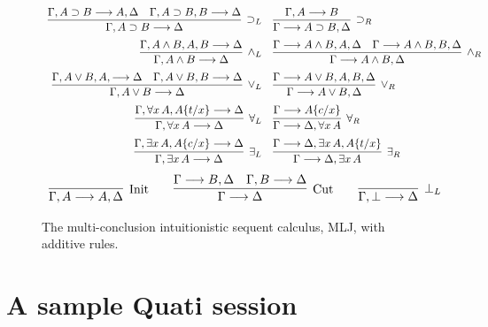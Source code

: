 \documentclass{llncs}
\begin{document}
\begin{figure}
\[
\begin{array} {r@{\quad}l}
\infer[{\supset_L}]{\Gamma, A\supset B \longrightarrow \Delta}{\Gamma,
A\supset B \longrightarrow A, \Delta \quad \Gamma,A\supset B, B \longrightarrow
\Delta }
&
\infer[{\supset_R}]{\Gamma \longrightarrow A \supset B, \Delta}{\Gamma, A
\longrightarrow B}
\\[5pt]
\infer[{\land_L}]{\Gamma, A \land B \longrightarrow \Delta}{\Gamma, A \land
B, A,B \longrightarrow \Delta }
&
\infer[{\land_R}]{\Gamma \longrightarrow A \land B, \Delta}{\Gamma \longrightarrow
A \land B, A, \Delta \quad \Gamma \longrightarrow A \land B,B, \Delta}
\\
[5pt]
\infer[{\lor_L}]{\Gamma, A \lor B \longrightarrow  \Delta}{\Gamma, A \lor B,
A, \longrightarrow \Delta \quad \Gamma, A \lor B,B \longrightarrow  \Delta}
&
\infer[{\lor_R}]{\Gamma \longrightarrow A \lor B, \Delta}{\Gamma \longrightarrow A
\lor B, A,B, \Delta }
\\
[5pt]
\infer[{\forall_L}]{\Gamma, \forall x\,A \longrightarrow \Delta}{\Gamma,
\forall x\,A, A\{t/x\} \longrightarrow \Delta} 
&
\infer[{\forall_R}]{\Gamma \longrightarrow \Delta, \forall x\,A}{\Gamma
\longrightarrow A\{c/x\}}
\\
[5pt]
\infer[{\exists_L}]{\Gamma, \exists x\, A \longrightarrow
\Delta}{\Gamma, \exists x\, A , A\{c/ x\} \longrightarrow \Delta} 
&
\infer[{\exists_R}]{\Gamma \longrightarrow \Delta, \exists x\, A}
{\Gamma \longrightarrow \Delta, \exists x\, A, A \{t/x\}}
\end{array}
\]
\[
\begin{array}{c@{\qquad}c@{\qquad}c}
 \infer[{\textrm{Init}}]{\Gamma,A \longrightarrow A, \Delta}{} 
&
\infer[{\textrm{Cut}}]{\Gamma \longrightarrow \Delta}{\Gamma
\longrightarrow B,\Delta \quad \Gamma, B \longrightarrow \Delta}
&
\infer[{\bot_L}]{\Gamma,\bot \longrightarrow \Delta}{} 
\end{array}
\]
\caption{The multi-conclusion intuitionistic sequent calculus, MLJ,
with additive rules.}\label{Fig:mLJ}
\end{figure}


\section{A sample Quati session}
\end{document}
